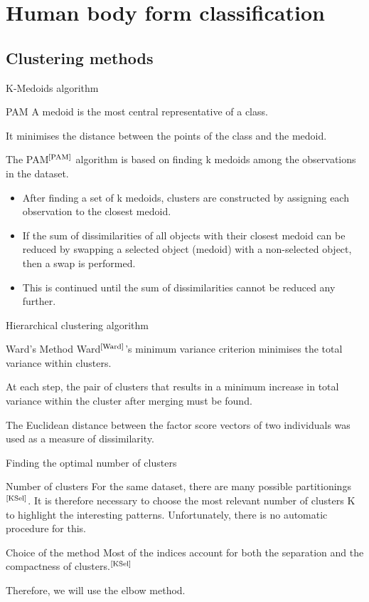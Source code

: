 \documentclass[10pt]{beamer}
\newcommand{\bib}[1]{$^\text{\cite{#1}}$}
\begin{document}
\section{Human body form classification}
\subsection{Clustering methods}
\begin{frame}{K-Medoids algorithm}
	\begin{block}{PAM}
		A medoid is the most central representative of a class.

		It minimises the distance between the points of the class and the medoid.

		The PAM\bib{PAM} algorithm is based on finding k medoids among the observations in the dataset.
		\begin{itemize}
			\item After finding a set of k medoids, clusters are constructed by assigning each observation to the closest medoid.
			\item If the sum of dissimilarities of all objects with their closest medoid can be reduced by swapping a selected object (medoid) with a non-selected object, then a swap is performed.
			\item This is continued until the sum of dissimilarities cannot be reduced any further.
		\end{itemize}
	\end{block}
\end{frame}

\begin{frame}{Hierarchical clustering algorithm}
	\begin{block}{Ward's Method}
		Ward\bib{Ward}'s minimum variance criterion minimises the total variance within clusters.

		At each step, the pair of clusters that results in a minimum increase in total variance within the cluster after merging must be found.

		The Euclidean distance between the factor score vectors of two individuals was used as a measure of dissimilarity.
	\end{block}
\end{frame}

\begin{frame}{Finding the optimal number of clusters}
	\begin{block}{Number of clusters}
		For the same dataset, there are many possible partitionings\bib{KSel}.
		It is therefore necessary to choose the most relevant number of clusters K to highlight the interesting patterns.
		Unfortunately, there is no automatic procedure for this.
	\end{block}\pause
	\begin{exampleblock}{Choice of the method}
		Most of the indices account for both the separation and the compactness of clusters.\bib{KSel}

		Therefore, we will use the elbow method.
	\end{exampleblock}
\end{frame}
\end{document}
